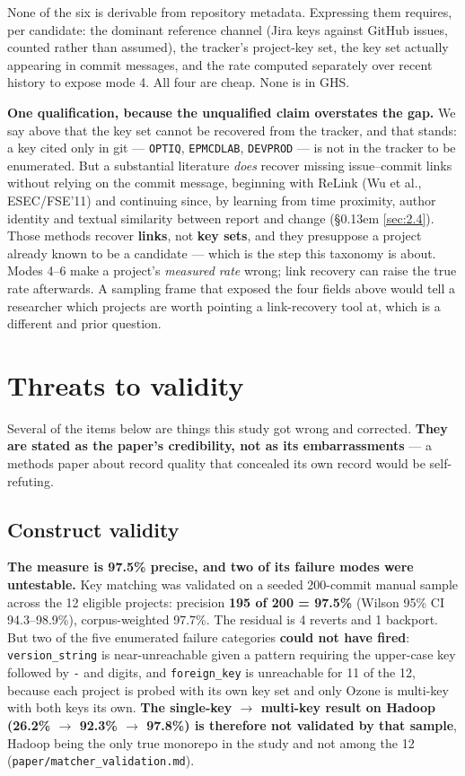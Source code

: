 \documentclass[conference]{IEEEtran}
\begin{document}
None of the six is derivable from repository metadata. Expressing them requires, per candidate: the dominant reference channel (Jira keys against GitHub issues, counted rather than assumed), the tracker's project-key set, the key set actually appearing in commit messages, and the rate computed separately over recent history to expose mode 4. All four are cheap. None is in GHS.

\textbf{One qualification, because the unqualified claim overstates the gap.} We say above that the key set cannot be recovered from the tracker, and that stands: a key cited only in git --- \texttt{OPTIQ}, \texttt{EPMCDLAB}, \texttt{DEVPROD} --- is not in the tracker to be enumerated. But a substantial literature \emph{does} recover missing issue--commit links without relying on the commit message, beginning with ReLink \cite{wu2011relink} (Wu et al., ESEC/FSE'11) and continuing since, by learning from time proximity, author identity and textual similarity between report and change (\S\kern0.13em \ref{sec:2.4}). Those methods recover \textbf{links}, not \textbf{key sets}, and they presuppose a project already known to be a candidate --- which is the step this taxonomy is about. Modes 4--6 make a project's \emph{measured rate} wrong; link recovery can raise the true rate afterwards. A sampling frame that exposed the four fields above would tell a researcher which projects are worth pointing a link-recovery tool at, which is a different and prior question.


\section{Threats to validity}
\label{sec:6}

Several of the items below are things this study got wrong and corrected. \textbf{They are stated as the paper's credibility, not as its embarrassments} --- a methods paper about record quality that concealed its own record would be self-refuting.

\subsection{Construct validity}
\label{sec:6.1}

\textbf{The measure is 97.5\% precise, and two of its failure modes were untestable.} Key matching was validated on a seeded 200-commit manual sample across the 12 eligible projects: precision \textbf{195 of 200 = 97.5\%} (Wilson 95\% CI 94.3--98.9\%), corpus-weighted 97.7\%. The residual is 4 reverts and 1 backport. But two of the five enumerated failure categories \textbf{could not have fired}: \texttt{version\_\allowbreak{}string} is near-unreachable given a pattern requiring the upper-case key followed by \texttt{-\allowbreak{}} and digits, and \texttt{foreign\_\allowbreak{}key} is unreachable for 11 of the 12, because each project is probed with its own key set and only Ozone is multi-key with both keys its own. \textbf{The single-key $\rightarrow$ multi-key result on Hadoop (26.2\% $\rightarrow$ 92.3\% $\rightarrow$ 97.8\%) is therefore not validated by that sample}, Hadoop being the only true monorepo in the study and not among the 12 (\texttt{paper/\allowbreak{}matcher\_\allowbreak{}validation.\allowbreak{}md}).
\end{document}

